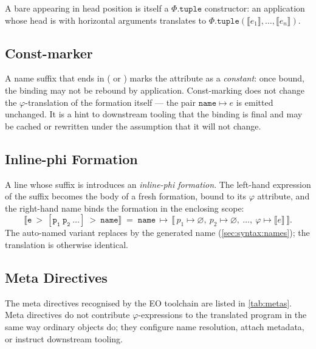 A bare \ff{*} appearing in head position is itself a
  \(\Phi.\mathtt{tuple}\) constructor: an application whose head is \ff{*}
  with horizontal arguments translates to
  \(\Phi.\mathtt{tuple}(\llbracket e_1 \rrbracket, \ldots, \llbracket e_n \rrbracket)\).

\subsection{Const-marker}\label{sec:sem:const}

A name suffix that ends in \ff{!} ( or \ff{>>!}) marks the
  attribute as a \emph{constant}: once bound, the binding may not be
  rebound by application.
Const-marking does not change the \(\varphi\)-translation of the formation
  itself --- the pair $\mathtt{name} \mapsto e$ is emitted unchanged.
It is a hint to downstream tooling that the binding is final and may be
  cached or rewritten under the assumption that it will not change.

\subsection{Inline-phi Formation}\label{sec:sem:inline-phi}

A line whose suffix is  introduces an
  \emph{inline-phi formation}.
The left-hand expression of the suffix becomes the body of a fresh
  formation, bound to its \(\varphi\) attribute, and the right-hand name
  binds the formation in the enclosing scope:
\begin{equation*}
  \llbracket \mathtt{e\ >\ [p_1\ p_2\ \ldots]\ >\ name} \rrbracket\;=\;
    \mathtt{name}\,\mapsto\,
      \llbracket\,
        p_1 \mapsto \varnothing,\ p_2 \mapsto \varnothing,\ \ldots,\
        \varphi \mapsto \llbracket e \rrbracket
      \,\rrbracket.
\end{equation*}
The auto-named variant \ff{> [params] >>} replaces  by the
  generated name (\cref{sec:syntax:names});
  the translation is otherwise identical.

\subsection{Meta Directives}\label{sec:sem:meta}

The meta directives recognised by the EO toolchain are listed in
  \cref{tab:metas}.
Meta directives do not contribute \(\varphi\)-expressions to the
  translated program in the same way ordinary objects do;
  they configure name resolution, attach metadata, or instruct downstream
  tooling.

